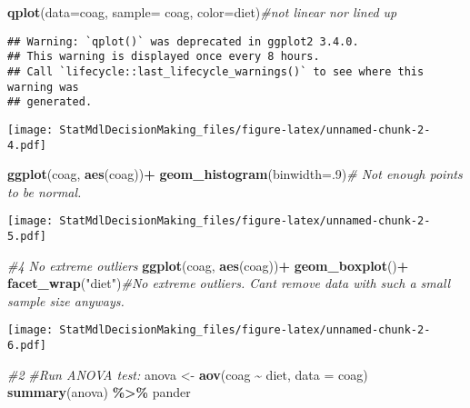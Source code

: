 \documentclass[
]{article}
\newenvironment{Shaded}{\begin{snugshade}}{\end{snugshade}}
\newcommand{\AttributeTok}[1]{\textcolor[rgb]{0.13,0.29,0.53}{#1}}
\newcommand{\CommentTok}[1]{\textcolor[rgb]{0.56,0.35,0.01}{\textit{#1}}}
\newcommand{\DecValTok}[1]{\textcolor[rgb]{0.00,0.00,0.81}{#1}}
\newcommand{\FunctionTok}[1]{\textcolor[rgb]{0.13,0.29,0.53}{\textbf{#1}}}
\newcommand{\NormalTok}[1]{#1}
\newcommand{\OtherTok}[1]{\textcolor[rgb]{0.56,0.35,0.01}{#1}}
\newcommand{\SpecialCharTok}[1]{\textcolor[rgb]{0.81,0.36,0.00}{\textbf{#1}}}
\newcommand{\StringTok}[1]{\textcolor[rgb]{0.31,0.60,0.02}{#1}}
\begin{document}
\begin{Shaded}
\begin{Highlighting}[]
      \FunctionTok{qplot}\NormalTok{(}\AttributeTok{data=}\NormalTok{coag, }\AttributeTok{sample=}\NormalTok{ coag, }\AttributeTok{color=}\NormalTok{diet)}\CommentTok{\#not linear nor lined up}
\end{Highlighting}
\end{Shaded}

\begin{verbatim}
## Warning: `qplot()` was deprecated in ggplot2 3.4.0.
## This warning is displayed once every 8 hours.
## Call `lifecycle::last_lifecycle_warnings()` to see where this warning was
## generated.
\end{verbatim}

\texttt{[image: StatMdlDecisionMaking\_files/figure-latex/unnamed-chunk-2-4.pdf]}

\begin{Shaded}
\begin{Highlighting}[]
      \FunctionTok{ggplot}\NormalTok{(coag, }\FunctionTok{aes}\NormalTok{(coag))}\SpecialCharTok{+}
      \FunctionTok{geom\_histogram}\NormalTok{(}\AttributeTok{binwidth=}\NormalTok{.}\DecValTok{9}\NormalTok{)}\CommentTok{\# Not enough points to be normal.}
\end{Highlighting}
\end{Shaded}

\texttt{[image: StatMdlDecisionMaking\_files/figure-latex/unnamed-chunk-2-5.pdf]}

\begin{Shaded}
\begin{Highlighting}[]
    \CommentTok{\#4 No extreme outliers}
      \FunctionTok{ggplot}\NormalTok{(coag, }\FunctionTok{aes}\NormalTok{(coag))}\SpecialCharTok{+}
      \FunctionTok{geom\_boxplot}\NormalTok{()}\SpecialCharTok{+}
        \FunctionTok{facet\_wrap}\NormalTok{(}\StringTok{"diet"}\NormalTok{)}\CommentTok{\#No extreme outliers. Can\textquotesingle{}t remove data with such a small sample size anyways.}
\end{Highlighting}
\end{Shaded}

\texttt{[image: StatMdlDecisionMaking\_files/figure-latex/unnamed-chunk-2-6.pdf]}

\begin{Shaded}
\begin{Highlighting}[]
\CommentTok{\#2}
\CommentTok{\#Run ANOVA test:}
\NormalTok{anova }\OtherTok{\textless{}{-}} \FunctionTok{aov}\NormalTok{(coag }\SpecialCharTok{\textasciitilde{}}\NormalTok{ diet, }\AttributeTok{data =}\NormalTok{ coag)}
\FunctionTok{summary}\NormalTok{(anova) }\SpecialCharTok{\%\textgreater{}\%}\NormalTok{ pander}
\end{Highlighting}
\end{Shaded}
\end{document}
